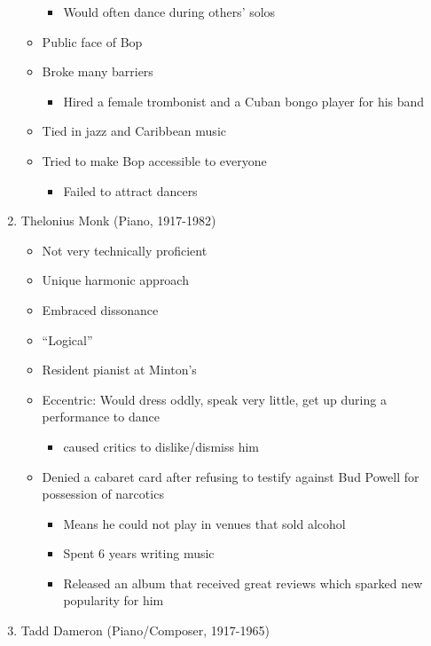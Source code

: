 \documentclass[]{article}
\providecommand{\tightlist}{%
  \setlength{\itemsep}{0pt}\setlength{\parskip}{0pt}}
\begin{document}
\begin{enumerate}
\begin{itemize}
    \begin{itemize}
    \tightlist
    \item
      Would often dance during others' solos
    \end{itemize}
  \item
    Public face of Bop
  \item
    Broke many barriers

    \begin{itemize}
    \tightlist
    \item
      Hired a female trombonist and a Cuban bongo player for his band
    \end{itemize}
  \item
    Tied in jazz and Caribbean music
  \item
    Tried to make Bop accessible to everyone

    \begin{itemize}
    \tightlist
    \item
      Failed to attract dancers
    \end{itemize}
  \end{itemize}
\item
  Thelonius Monk (Piano, 1917-1982)

  \begin{itemize}
  \tightlist
  \item
    Not very technically proficient
  \item
    Unique harmonic approach
  \item
    Embraced dissonance
  \item
    ``Logical''
  \item
    Resident pianist at Minton's
  \item
    Eccentric: Would dress oddly, speak very little, get up during a
    performance to dance

    \begin{itemize}
    \tightlist
    \item
      caused critics to dislike/dismiss him
    \end{itemize}
  \item
    Denied a cabaret card after refusing to testify against Bud Powell
    for possession of narcotics

    \begin{itemize}
    \tightlist
    \item
      Means he could not play in venues that sold alcohol
    \item
      Spent 6 years writing music
    \item
      Released an album that received great reviews which sparked new
      popularity for him
    \end{itemize}
  \end{itemize}
\item
  Tadd Dameron (Piano/Composer, 1917-1965)


\end{enumerate}
\end{document}
